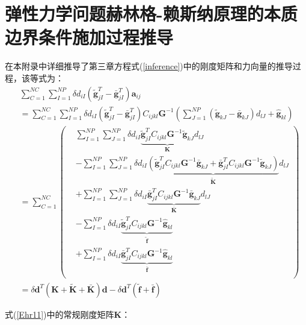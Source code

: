 \chapter{弹性力学问题赫林格-赖斯纳原理的本质边界条件施加过程推导}\label{A}
在本附录中详细推导了第三章方程式(\ref{inference})中的刚度矩阵和力向量的推导过程，该等式为：
\begin{equation}
    \begin{split}
        &\sum_{C=1}^{N\!C}\sum_{I=1}^{N\!P}\delta d_{iI}(\tilde{\pmb g}_{jI}^T-\bar{\pmb g}_{jI}^T)\pmb{a}_{ij}\\
        &=\sum_{C=1}^{N\!C}\sum_{I=1}^{N\!P}\delta d_{iI}(\tilde{\pmb g}_{jI}^T-\bar{\pmb g}_{jI}^T)C_{ijkl}\pmb{G}^{-1}(\sum_{J=1}^{N\!P}(\tilde{\pmb g}_{kJ}-\bar{\pmb g}_{kJ})d_{lJ}+\hat{\pmb g}_{kl})\\
        &=\sum_{C=1}^{N\!C}
        \left(\begin{split}
        &\sum_{I=1}^{N\!P}\sum_{J=1}^{N\!P}\delta d_{iI}\underbrace{\tilde{\pmb g}^T_{jI}C_{ijkl}\pmb{G}^{-1}\tilde{\pmb g}_{kJ}}_{\pmb{K}}d_{lJ}\\
        &-\sum_{I=1}^{N\!P}\sum_{J=1}^{N\!P}\delta d_{iI}\underbrace{(\tilde{\pmb g}^T_{jI}C_{ijkl}\pmb{G}^{-1}\bar{\pmb g}_{kJ}
        +\bar{\pmb g}^T_{jI}C_{ijkl}\pmb{G}^{-1}\tilde{\pmb g}_{kJ})}_{\tilde{\pmb K}}d_{lJ}\\
        &+\sum_{I=1}^{N\!P}\sum_{J=1}^{N\!P}\delta d_{iI}\underbrace{\bar{\pmb g}^T_{jI}C_{ijkl}\pmb{G}^{-1}\bar{\pmb g}_{kJ}}_{\bar{\pmb K}}d_{lJ}\\
        &-\sum_{I=1}^{N\!P}\delta d_{iI}\underbrace{\tilde{\pmb g}_{jI}^TC_{ijkl}\pmb{G}^{-1}\hat{\pmb g}_{kl}}_{\tilde{\pmb f}}\\
        &+\sum_{I=1}^{N\!P}\delta d_{iI}\underbrace{\bar{\pmb g}_{jI}^TC_{ijkl}\pmb{G}^{-1}\hat{\pmb g}_{kl}}_{\bar{\pmb f}}\\
        \end{split}
        \right)\\
        &=\delta\pmb{d}^T(\pmb K+\tilde{\pmb K}+\bar{\pmb K})\pmb{d}-\delta\pmb{d}^T(\tilde{\pmb f}+\bar{\pmb f})
    \end{split}
    \end{equation}\par
\newpage
式(\ref{Ehr11})中的常规刚度矩阵$\pmb{K}$：
